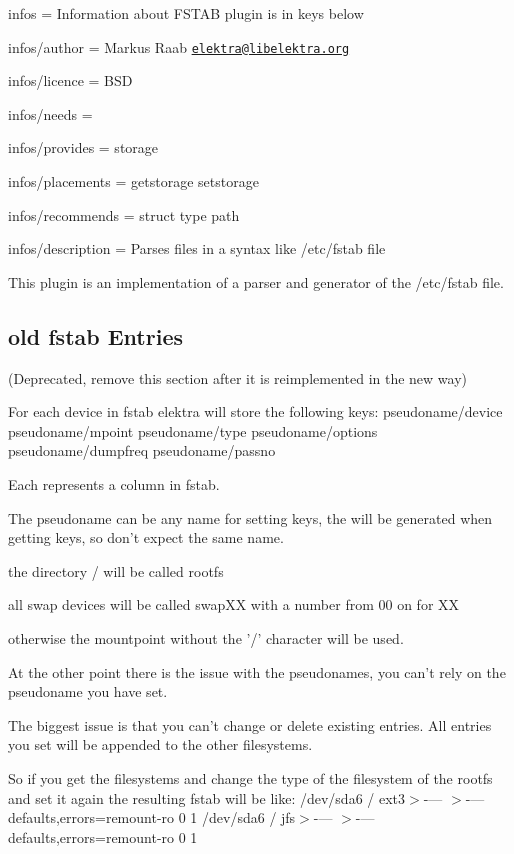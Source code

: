 
\begin{DoxyItemize}
\item infos = Information about F\+S\+T\+A\+B plugin is in keys below
\item infos/author = Markus Raab \href{mailto:elektra@libelektra.org}{\tt elektra@libelektra.\+org}
\item infos/licence = B\+S\+D
\item infos/needs =
\item infos/provides = storage
\item infos/placements = getstorage setstorage
\item infos/recommends = struct type path
\item infos/description = Parses files in a syntax like /etc/fstab file
\end{DoxyItemize}

This plugin is an implementation of a parser and generator of the /etc/fstab file.

\subsection*{old fstab Entries}

(Deprecated, remove this section after it is reimplemented in the new way)

For each device in fstab elektra will store the following keys\+: pseudoname/device pseudoname/mpoint pseudoname/type pseudoname/options pseudoname/dumpfreq pseudoname/passno

Each represents a column in fstab.

The pseudoname can be any name for setting keys, the will be generated when getting keys, so don't expect the same name.

the directory / will be called rootfs

all swap devices will be called swap\+X\+X with a number from 00 on for X\+X

otherwise the mountpoint without the '/' character will be used.

At the other point there is the issue with the pseudonames, you can't rely on the pseudoname you have set.

The biggest issue is that you can't change or delete existing entries. All entries you set will be appended to the other filesystems.

So if you get the filesystems and change the type of the filesystem of the rootfs and set it again the resulting fstab will be like\+: /dev/sda6 / ext3$>$-\/--- $>$-\/---defaults,errors=remount-\/ro 0 1 /dev/sda6 / jfs$>$-\/--- $>$-\/---defaults,errors=remount-\/ro 0 1

